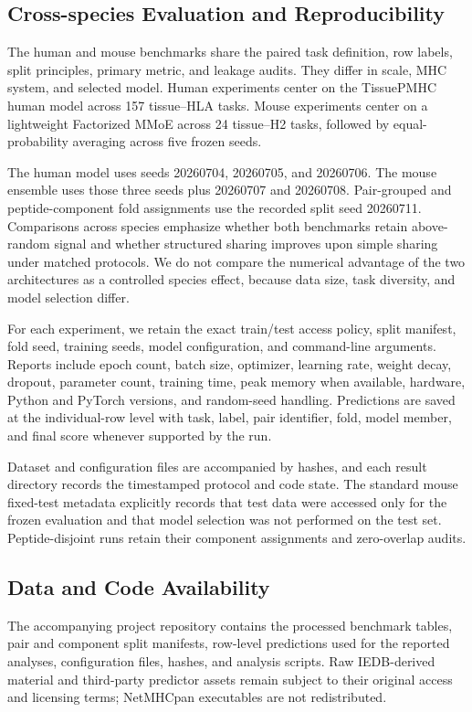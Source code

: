 \subsection{Cross-species Evaluation and Reproducibility}

The human and mouse benchmarks share the paired task definition, row labels, split principles, primary metric, and leakage audits. They differ in scale, MHC system, and selected model. Human experiments center on the TissuePMHC human model across 157 tissue--HLA tasks. Mouse experiments center on a lightweight Factorized MMoE across 24 tissue--H2 tasks, followed by equal-probability averaging across five frozen seeds.

The human model uses seeds 20260704, 20260705, and 20260706. The mouse ensemble uses those three seeds plus 20260707 and 20260708. Pair-grouped and peptide-component fold assignments use the recorded split seed 20260711. Comparisons across species emphasize whether both benchmarks retain above-random signal and whether structured sharing improves upon simple sharing under matched protocols. We do not compare the numerical advantage of the two architectures as a controlled species effect, because data size, task diversity, and model selection differ.

For each experiment, we retain the exact train/test access policy, split manifest, fold seed, training seeds, model configuration, and command-line arguments. Reports include epoch count, batch size, optimizer, learning rate, weight decay, dropout, parameter count, training time, peak memory when available, hardware, Python and PyTorch versions, and random-seed handling. Predictions are saved at the individual-row level with task, label, pair identifier, fold, model member, and final score whenever supported by the run.

Dataset and configuration files are accompanied by hashes, and each result directory records the timestamped protocol and code state. The standard mouse fixed-test metadata explicitly records that test data were accessed only for the frozen evaluation and that model selection was not performed on the test set. Peptide-disjoint runs retain their component assignments and zero-overlap audits.

\subsection{Data and Code Availability}

The accompanying project repository contains the processed benchmark tables, pair and component split manifests, row-level predictions used for the reported analyses, configuration files, hashes, and analysis scripts. Raw IEDB-derived material and third-party predictor assets remain subject to their original access and licensing terms; NetMHCpan executables are not redistributed.

